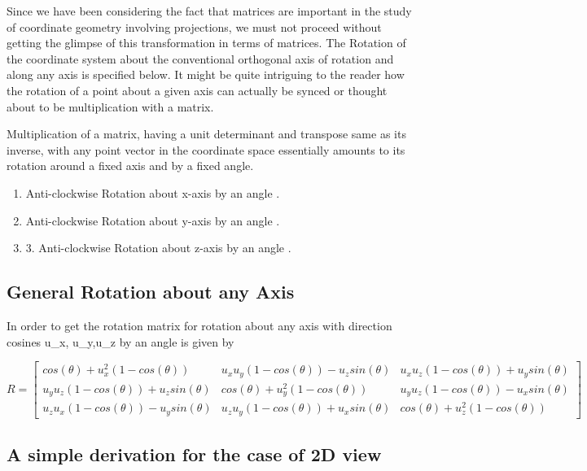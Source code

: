 \documentclass[12pt]{report}
\begin{document}
\hspace{1cm} Since we have been considering the fact that matrices are important in the study of coordinate geometry involving projections, we must not proceed without getting the glimpse of this transformation in terms of matrices. The Rotation of the coordinate system about the conventional orthogonal axis of rotation and along any axis is specified below.
\vspace{0.3cm}
It might be quite intriguing to the reader how the rotation of a point about a given axis can actually be synced or thought about to be multiplication with a matrix. 

\begin{lemma}
  Multiplication of a matrix, having a unit determinant and transpose same as its inverse, with any point vector in the coordinate space essentially amounts to its rotation around a fixed axis and by a fixed angle.
\end{lemma}

\begin{enumerate}
  \item Anti-clockwise Rotation about x-axis by an angle \theta.
  \item Anti-clockwise Rotation about y-axis by an angle \theta. 
  \item 3. Anti-clockwise Rotation about z-axis by an angle \theta. 
\end{enumerate}

\subsection{General Rotation about any Axis}

In order to get the rotation matrix for rotation about any axis with direction cosines u_{x}, u_{y},u_{z} by an angle \theta is given by

\[ R =  \begin{bmatrix}
cos(\theta) + u_{x}^2(1-cos(\theta)) & u_{x}u_{y}(1-cos(\theta)) - u_{z}sin(\theta) &  u_{x}u_{z}(1-cos(\theta)) + u_{y}sin(\theta) \\
u_{y}u_{z}(1-cos(\theta)) + u_{z}sin(\theta) & cos(\theta) + u_{y}^2(1-cos(\theta)) &  u_{y}u_{z}(1-cos(\theta)) - u_{x}sin(\theta) \\
u_{z}u_{x}(1-cos(\theta)) - u_{y}sin(\theta) & u_{z}u_{y}(1-cos(\theta)) + u_{x}sin(\theta) & cos(\theta) + u_{z}^2(1-cos(\theta)) 
\end{bmatrix}\]

\subsection{A simple derivation for the case of 2D view}
\end{document}
